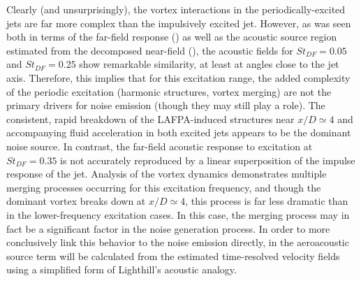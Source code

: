 Clearly (and unsurprisingly), the vortex interactions in the periodically-excited jets are far more complex than the impulsively excited jet.
However, as was seen both in terms of the far-field response () as well as the acoustic source region estimated from the decomposed near-field (), the acoustic fields for $St_{DF}=0.05$ and $St_{DF}=0.25$ show remarkable similarity, at least at angles close to the jet axis.
Therefore, this implies that for this excitation range, the added complexity of the periodic excitation (harmonic structures, vortex merging) are not the primary drivers for noise emission (though they may still play a role).
The consistent, rapid breakdown of the LAFPA-induced structures near $x/D \simeq 4$ and accompanying fluid acceleration in both excited jets appears to be the dominant noise source. 
In contrast, the far-field acoustic response to excitation at $St_{DF}=0.35$ is not accurately reproduced by a linear superposition of the impulse response of the jet.
Analysis of the vortex dynamics demonstrates multiple merging processes occurring for this excitation frequency, and though the dominant vortex breaks down at $x/D \simeq 4$, this process is far less dramatic than in the lower-frequency excitation cases.
In this case, the merging process may in fact be a significant factor in the noise generation process.
In order to more conclusively link this behavior to the noise emission directly, in  the aeroacoustic source term will be calculated from the estimated time-resolved velocity fields using a simplified form of Lighthill's acoustic analogy.